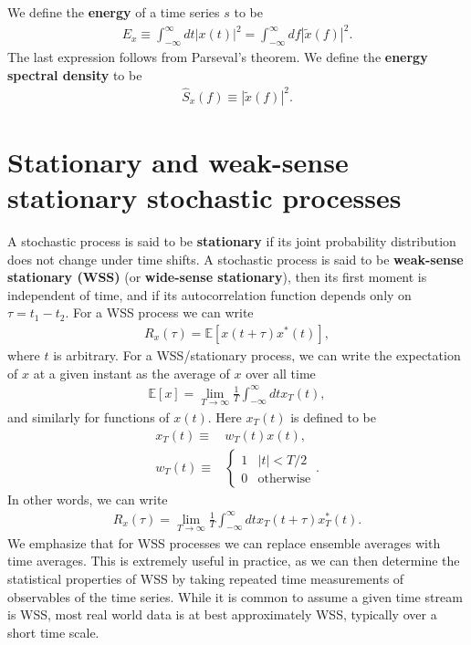 We define the \textbf{energy} of a time series $s$ to be 
\begin{align}
    E_{x}
    \equiv
    \int_{-\infty}^{\infty}dt \left|x\left(t\right)\right|^2
    =
    \int_{-\infty}^{\infty}df \left|\tilde{x}\left(f\right)\right|^2
    .
\end{align}
The last expression follows from Parseval's theorem.
We define the \textbf{energy spectral density} to be
\begin{align}
    \hat{S}_{x}\left(f\right)
    \equiv
    \left|\tilde{x}\left(f\right)\right|^2
    .
\end{align}

\section{Stationary and weak-sense stationary stochastic processes}

A stochastic process is said to be \textbf{stationary} if its joint probability
distribution does not change under time shifts. 
A stochastic process is said to be \textbf{weak-sense stationary (WSS)}
(or \textbf{wide-sense stationary}), then its first moment is independent of time,
and if its autocorrelation function depends only on $\tau=t_1-t_2$.
For a WSS process we can write
\begin{align}
    \label{eq:WSS-autocorrelation}
    R_x\left(\tau\right) 
    =
    \mathbb{E}\left[x\left(t+\tau\right)x^*\left(t\right)\right]
    ,
\end{align}
where $t$ is arbitrary.
For a WSS/stationary process, we can write the expectation of $x$ at a given instant as 
the average of $x$ over all time 
\begin{align}
    \mathbb{E}\left[x\right]
    =
    \lim_{T\to\infty}\frac{1}{T}\int_{-\infty}^{\infty}dt x_T\left(t\right)
    ,
\end{align}
and similarly for functions of $x(t)$.
Here $x_T\left(t\right)$ is defined to be
\begin{align}
    x_T\left(t\right) 
    \equiv& 
    w_T\left(t\right)x\left(t\right)
    ,\\
    w_T\left(t\right)
    \equiv&
    \begin{cases}
        1 & |t|<T/2
        \\
        0 & \mathrm{otherwise}
    \end{cases}
    .
\end{align}
In other words, we can write
\begin{align}
    \label{eq:autocorrelation-WSS-integral}
    R_x\left(\tau\right)
    =
    \lim_{T\to\infty}\frac{1}{T}\int_{-\infty}^{\infty}dt 
        x_T\left(t+\tau\right)x_T^*\left(t\right)
    .
\end{align}
We emphasize that for WSS processes we can replace ensemble averages with time averages.
This is extremely useful in practice, as we can then determine the statistical properties
of WSS by taking repeated time measurements of observables of the time series.
While it is common to assume a given time stream is WSS, 
most real world data is at best approximately WSS, typically over a short time scale.

